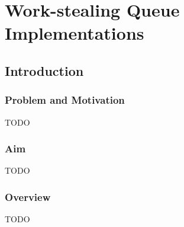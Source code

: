 
\part{Work-stealing Queue Implementations}
\label{part:locality}

\chapter{Introduction}
\label{chap:locality-introduction}

\section{Problem and Motivation}
\label{sec:locality-intro-problem-and-motivation}

TODO

\section{Aim}
\label{sec:locality-intro-aim}

TODO

\section{Overview}
\label{sec:locality-intro-overview}

TODO


